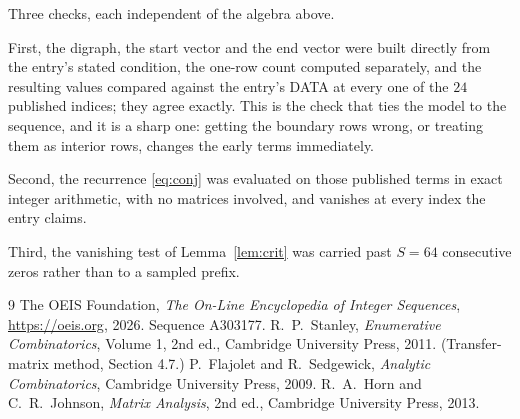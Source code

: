 \documentclass[11pt,a4paper]{article}
\theoremstyle{plain}
\theoremstyle{definition}
\begin{document}
Three checks, each independent of the algebra above.

First, the digraph, the start vector and the end vector were built directly from the
entry's stated condition, the one-row count computed separately, and the resulting values
compared against the entry's DATA at every one of the $24$ published indices; they
agree exactly. This is the check that ties the model to the sequence, and it is a sharp one:
getting the boundary rows wrong, or treating them as interior rows, changes the early terms
immediately.

Second, the recurrence \eqref{eq:conj} was evaluated on those published terms in exact
integer arithmetic, with no matrices involved, and vanishes at every index the entry claims.

Third, the vanishing test of Lemma~\ref{lem:crit} was carried past $S=64$ consecutive
zeros rather than to a sampled prefix.

\begin{thebibliography}{9}
 The OEIS Foundation, \emph{The On-Line Encyclopedia of Integer
Sequences}, \url{https://oeis.org}, 2026. Sequence A303177.
 R.~P.~Stanley, \emph{Enumerative Combinatorics}, Volume 1, 2nd ed.,
Cambridge University Press, 2011. (Transfer-matrix method, Section 4.7.)
 P.~Flajolet and R.~Sedgewick, \emph{Analytic Combinatorics}, Cambridge
University Press, 2009.
 R.~A.~Horn and C.~R.~Johnson, \emph{Matrix Analysis}, 2nd ed., Cambridge
University Press, 2013.
\end{thebibliography}
\end{document}
